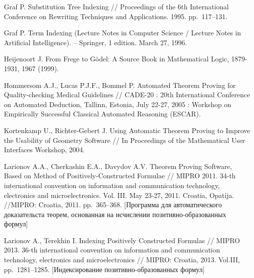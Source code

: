 \begin{thebibliography}{99}
 Graf P. Substitution Tree Indexing // Proceedings of the 6th International Conference on Rewriting Techniques and Applications. 1995. pp.~117--131.

 Graf P. Term Indexing (Lecture Notes in Computer Science / Lecture Notes in Artificial Intelligence). -- Springer, 1 edition. March 27, 1996.



 Heijenoort J. From Frege to Gödel: A Source Book in Mathematical Logic, 1879-1931, 1967 (1999).

 Hommersom A.J., Lucas P.J.F., Bommel P. Automated Theorem Proving for Quality-checking Medical Guidelines // CADE-20 : 20th International Conference on Automated Deduction, Tallinn, Estonia, July 22-27, 2005 : Workshop on Empirically Successful Classical Automated Reasoning (ESCAR).


 Kortenkamp U., Richter-Gebert J. Using Automatic Theorem Proving to Improve the Usability of Geometry Software // In Proceedings of the Mathematical User Interfaces Workshop, 2004.


  Larionov A.A., Cherkashin E.A., Davydov A.V. Theorem Proving Software, Based on Method of Positively-Constructed Formulae // MIPRO 2011. 34-th international convention on information and communication technology, electronics and microelectronics. Vol. III. May 23-27, 2011. Croatia, Opatija. //MIPRO: Croatia, 2011. pp.~365--368. [Программа для автоматического доказательста теорем, основанная на исчислении позитивно-образованных формул]

 Larionov A., Terekhin I. Indexing Positively Constructed Formulas // MIPRO 2013. 36-th international convention on information and communication technology, electronics and microelectronics // MIPRO: Croatia, 2013. Vol.III, pp.~1281--1285. [Индексирование позитивно-образованных формул]



\end{thebibliography}

